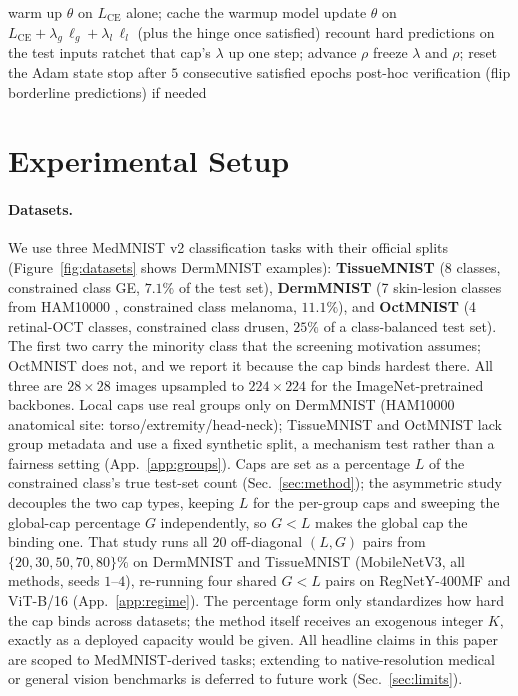 \documentclass[10pt]{article}
\begin{document}
\begin{algorithm}[t]
\caption{The training loop of the package studied here.}
\label{alg:tralo}
\begin{algorithmic}[1]
\State warm up $\theta$ on $L_{\text{CE}}$ alone; cache the warmup model
  \State update $\theta$ on $L_{\text{CE}} + \lambda_g\,\ell_g + \lambda_l\,\ell_l$ (plus the hinge once satisfied)
  \State recount hard predictions on the test inputs
    \State ratchet that cap's $\lambda$ up one step; advance $\rho$
    \State freeze $\lambda$ and $\rho$; reset the Adam state
  \EndIf
  \State stop after $5$ consecutive satisfied epochs
\EndFor
\State post-hoc verification (flip borderline predictions) if needed
\end{algorithmic}
\end{algorithm}

\section{Experimental Setup}
\label{sec:setup}

\paragraph{Datasets.}
We use three MedMNIST v2 \citep{yang2023medmnist} classification tasks with
their official splits (Figure~\ref{fig:datasets} shows DermMNIST examples):
\textbf{TissueMNIST} (8 classes, constrained class GE, $7.1\%$ of the test
set), \textbf{DermMNIST} (7 skin-lesion classes from HAM10000
\citep{tschandl2018ham10000}, constrained class melanoma, $11.1\%$), and
\textbf{OctMNIST} (4 retinal-OCT classes, constrained class drusen, $25\%$
of a class-balanced test set). The first two carry the minority class that
the screening motivation assumes; OctMNIST does not, and we report it
because the cap binds hardest there. All three are $28{\times}28$ images
upsampled to $224{\times}224$ for the ImageNet-pretrained backbones. Local
caps use real groups only on DermMNIST (HAM10000 anatomical site:
torso/extremity/head-neck); TissueMNIST and OctMNIST lack group metadata and
use a fixed synthetic split, a mechanism test rather than a fairness
setting (App.~\ref{app:groups}). Caps are set as a percentage $L$ of the
constrained class's true test-set count (Sec.~\ref{sec:method}); the
asymmetric study decouples the two cap types, keeping $L$ for the per-group
caps and sweeping the global-cap percentage $G$ independently, so $G{<}L$
makes the global cap the binding one. That study runs all $20$ off-diagonal
$(L,G)$ pairs from $\{20,30,50,70,80\}\%$ on DermMNIST and TissueMNIST
(MobileNetV3, all methods, seeds $1$--$4$), re-running four shared $G{<}L$
pairs on RegNetY-400MF and ViT-B/16 (App.~\ref{app:regime}). The
percentage form only standardizes how hard the cap binds across datasets;
the method itself receives an exogenous integer $K$, exactly as a deployed
capacity would be given. All headline claims in this paper are scoped to
MedMNIST-derived tasks; extending to native-resolution medical or general
vision benchmarks is deferred to future work (Sec.~\ref{sec:limits}).
\end{document}
